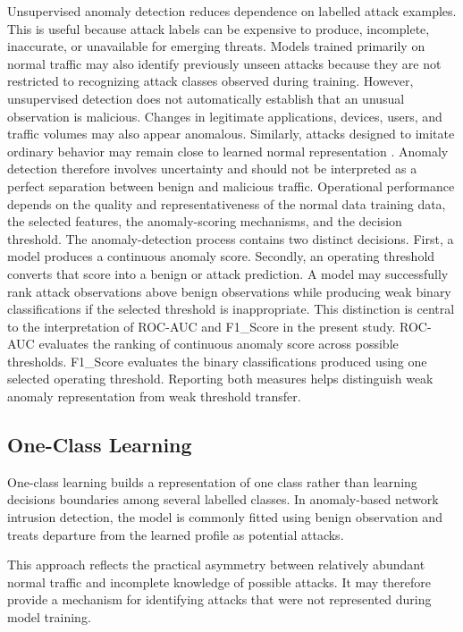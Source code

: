 Unsupervised anomaly detection reduces dependence on labelled attack examples. This is useful because attack labels can be expensive to produce, incomplete, inaccurate, or unavailable for emerging threats. Models trained 
primarily on normal traffic may also identify previously unseen attacks because they are not restricted to recognizing attack classes observed during training. However, unsupervised detection does not automatically establish 
that an unusual observation is malicious. Changes in legitimate applications, devices, users, and traffic volumes may also appear anomalous. Similarly, attacks designed to imitate ordinary behavior may remain close to learned 
normal representation \cite{Pang2021,Chou2022}. Anomaly detection therefore involves uncertainty and should not be interpreted as a perfect separation between benign and malicious traffic. Operational performance depends on the 
quality and representativeness of the normal data training data, the selected features, the anomaly-scoring mechanisms, and the decision threshold. The anomaly-detection process contains two distinct decisions. First, a model produces 
a continuous anomaly score. Secondly, an operating threshold converts that score into a benign or attack prediction. A model may successfully rank attack observations above benign observations while producing weak binary classifications 
if the selected threshold is inappropriate. This distinction is central to the interpretation of ROC-AUC and F1\_Score in the present study.
ROC-AUC evaluates the ranking of continuous anomaly score across possible thresholds. F1\_Score evaluates the binary classifications produced using one selected operating threshold. Reporting both measures helps distinguish weak anomaly 
representation from weak threshold transfer.

\subsection{One-Class Learning}
\label{subsec:one-class-learning}

One-class learning builds a representation of one class rather than learning decisions boundaries among several labelled classes. In anomaly-based network intrusion detection, the model is commonly fitted using benign  observation and treats departure from the learned profile as potential attacks. 

This approach reflects the practical asymmetry between relatively abundant normal traffic and incomplete knowledge of possible attacks. It may therefore provide a mechanism for identifying attacks that were not represented during model training.

